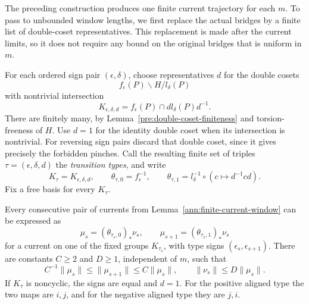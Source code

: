 The preceding construction produces one finite current trajectory for
each $m$.  To pass to unbounded window lengths, we first replace the
actual bridges by a finite list of double-coset representatives.  This
replacement is made after the current limits, so it does not require
any bound on the original bridges that is uniform in $m$.

For each ordered sign pair $(\epsilon,\delta)$, choose representatives
$d$ for the double cosets
\[
 f_\epsilon(P)\backslash H/l_\delta(P)
\]
with nontrivial intersection
\[
 K_{\epsilon,\delta,d}
   =f_\epsilon(P)\cap d l_\delta(P)d^{-1}.
\]
There are finitely many, by Lemma~\ref{pre:double-coset-finiteness}
and torsion-freeness of $H$.  Use $d=1$ for the identity double coset
when its intersection is nontrivial.  For reversing sign pairs discard
that double coset, since it gives precisely the forbidden pinches.
Call the resulting finite set of triples
$\tau=(\epsilon,\delta,d)$ the \emph{transition types}, and write
\begin{equation}
 K_\tau=K_{\epsilon,\delta,d},\qquad
 \theta_{\tau,0}=f_\epsilon^{-1},\qquad
 \theta_{\tau,1}=l_\delta^{-1}\circ(c\mapsto d^{-1}cd).
 \label{ann:type-maps}
\end{equation}
Fix a free basis for every $K_\tau$.

\begin{lemma}
\label{ann:finite-types}
Every consecutive pair of currents from
Lemma~\ref{ann:finite-current-window} can be expressed as
\[
 \mu_s=(\theta_{\tau_s,0})_*\nu_s,
 \qquad
 \mu_{s+1}=(\theta_{\tau_s,1})_*\nu_s
\]
for a current on one of the fixed groups $K_{\tau_s}$, with type
signs $(\epsilon_s,\epsilon_{s+1})$.  There are constants $C\geq2$
and $D\geq1$, independent of $m$, such that
\begin{equation}
 C^{-1}\|\mu_s\|\leq\|\mu_{s+1}\|\leq C\|\mu_s\|,
 \qquad \|\nu_s\|\leq D\|\mu_s\|.
 \label{ann:uniform-transition-bounds}
\end{equation}
If $K_\tau$ is noncyclic, the signs are equal and $d=1$.
For the positive aligned type the two maps are $i,j$, and for the
negative aligned type they are $j,i$.
\end{lemma}

